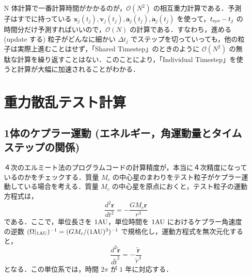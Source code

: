 \documentclass[11pt,a4paper,oneside,onecolumn]{jreport}
\begin{document}
N 体計算で一番計算時間がかかるのが，$\mathcal{O} (N^2)$ の相互重力計算である．予測子はすでに持っている ${\bm x}_j (t_j), {\bm v}_j (t_j), {\bm a}_j (t_j), \dot{{\bm a}}_j (t_j)$ を使って，$t_{{\rm sys}} - t_j$ の時間分だけ予測すればいいので，$\mathcal{O} (N)$ の計算である．すなわち，進める (update する) 粒子がどんなに細かい $\Delta t_j$ でステップを切っていっても，他の粒子は実際上進むことはせず，「Shared Timestep」のときのように $\mathcal{O} (N^2)$ の無駄な計算を繰り返すことはない．このことにより，「Individual Timestep」を使うと計算が大幅に加速されることがわかる．

\section{重力散乱テスト計算}
\subsection{1体のケプラー運動 (エネルギー，角運動量とタイムステップの関係)}
４次のエルミート法のプログラムコードの計算精度が，本当に４次精度になっているのかをチェックする．質量 $M_c$ の中心星のまわりをテスト粒子がケプラー運動している場合を考える．質量 $M_c$ の中心星を原点におくと，テスト粒子の運動方程式は，
\begin{equation}
\frac{d^2 {\bm r}}{d t^2} = - \frac{G M_c {\bm r}}{r^3}
\end{equation}
である．ここで，単位長さを $1 {\rm AU}$，単位時間を $1 {\rm AU}$ におけるケプラー角速度の逆数 $(\Omega |_{1 {\rm AU}})^{-1} = (G  M_c / (1 {\rm AU})^3)^{-1}$ で規格化し，運動方程式を無次元化すると，
\begin{equation}
\frac{d^2 \tilde{\bm r}}{d  \tilde{t}^2} = - \frac{\tilde{\bm r}}{\tilde{r}^3}
\end{equation}
となる．この単位系では，時間 $2 \pi$ が $1$ 年に対応する．
\end{document}
